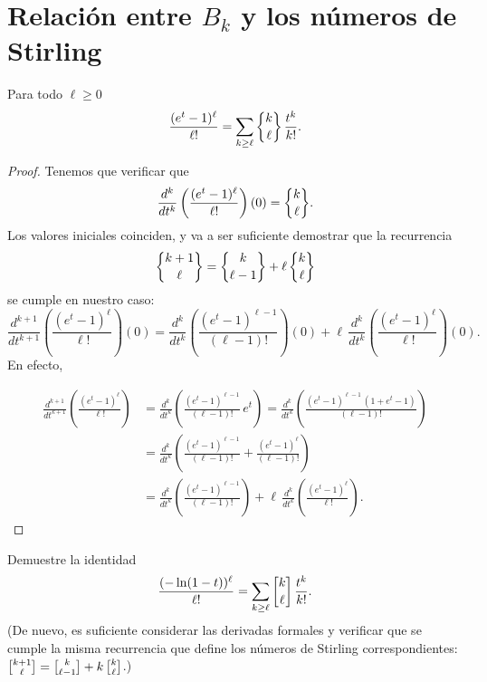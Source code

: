 \documentclass{article}
\begin{document}
\pagebreak


\section*{Relación entre $B_k$ y los números de Stirling}

\begin{lema*}
\label{exp-stirling}
Para todo $\ell \ge 0$
$$\frac{(e^t - 1)^\ell}{\ell!} = \sum_{k \ge \ell} \Stirling{k}{\ell}\,\frac{t^k}{k!}.$$

\begin{proof}
Tenemos que verificar que
$$\frac{d^k}{dt^k} \left(\frac{(e^t - 1)^\ell}{\ell!}\right) (0) = \Stirling{k}{\ell}.$$
Los valores iniciales coinciden, y va a ser suficiente demostrar que la recurrencia
$$\Stirling{k+1}{\ell} = \Stirling{k}{\ell-1} + \ell \, \Stirling{k}{\ell}$$
se cumple en nuestro caso:
$$\frac{d^{k+1}}{dt^{k+1}} \left(\frac{(e^t - 1)^\ell}{\ell!}\right) (0) = \frac{d^k}{dt^k} \left(\frac{(e^t - 1)^{\ell-1}}{(\ell-1)!}\right) (0) + \ell\,\frac{d^k}{dt^k} \left(\frac{(e^t - 1)^\ell}{\ell!}\right) (0).$$
En efecto,

\begin{align*}
\frac{d^{k+1}}{dt^{k+1}} \left(\frac{(e^t - 1)^\ell}{\ell!}\right) & = \frac{d^k}{dt^k} \left(\frac{(e^t - 1)^{\ell-1}}{(\ell-1)!}\,e^t\right) = \frac{d^k}{dt^k} \left(\frac{(e^t - 1)^{\ell-1} \, (1 + e^t - 1)}{(\ell - 1)!}\right) \\
 & = \frac{d^k}{dt^k} \left(\frac{(e^t - 1)^{\ell-1}}{(\ell-1)!} + \frac{(e^t-1)^\ell}{(\ell-1)!}\right) \\
 & = \frac{d^k}{dt^k} \left(\frac{(e^t - 1)^{\ell-1}}{(\ell-1)!}\right) + \ell\,\frac{d^k}{dt^k} \left(\frac{(e^t-1)^\ell}{\ell!}\right).
\end{align*}
\end{proof}
\end{lema*}

\begin{ejercicio*}
\label{log-stirling}
Demuestre la identidad
$$\frac{(-\ln (1-t))^\ell}{\ell!} = \sum_{k \ge \ell} \stirling{k}{\ell}\,\frac{t^k}{k!}.$$
(De nuevo, es suficiente considerar las derivadas formales y verificar que se cumple la misma recurrencia que define los números de Stirling correspondientes: $\stirling{k+1}{\ell} = \stirling{k}{\ell-1} + k\,\stirling{k}{\ell}$.)
\end{ejercicio*}
\end{document}
